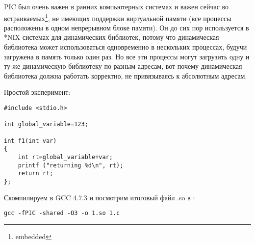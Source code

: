 \ac{PIC} был очень важен в ранних компьютерных системах и важен сейчас во встраиваемых\footnote{embedded}, не имеющих поддержки виртуальной памяти (все процессы расположены в одном непрерывном блоке памяти).
Он до сих пор используется в *NIX системах для динамических библиотек, потому что динамическая библиотека может использоваться одновременно в нескольких процессах, будучи загружена в память только один раз.
Но все эти процессы могут загрузить одну и ту же динамическую библиотеку по разным адресам, вот почему динамическая библиотека должна работать корректно, не привязываясь к абсолютным адресам.

Простой эксперимент:

\begin{lstlisting}
#include <stdio.h>

int global_variable=123;

int f1(int var)
{
    int rt=global_variable+var;
    printf ("returning %d\n", rt);
    return rt;
};
\end{lstlisting}

Скомпилируем в GCC 4.7.3 и посмотрим итоговый файл .so в \IDA:

\begin{lstlisting}
gcc -fPIC -shared -O3 -o 1.so 1.c
\end{lstlisting}

